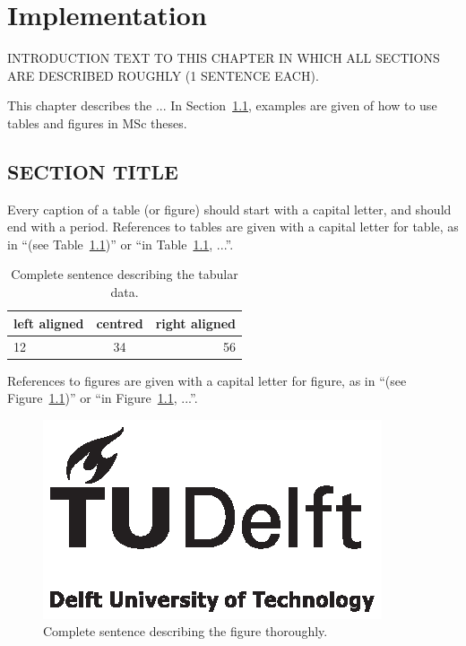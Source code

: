 \chapter{Implementation}
\label{chp:CHAPTERTITLE}
INTRODUCTION TEXT TO THIS CHAPTER IN WHICH ALL SECTIONS ARE DESCRIBED ROUGHLY (1 SENTENCE EACH).

This chapter describes the ... In Section~\ref{sec:SECTIONTITLE}, examples are given of how to use tables and figures in MSc theses.

\section{SECTION TITLE}
\label{sec:SECTIONTITLE}

Every caption of a table (or figure) should start with a capital letter, and should end with a period. References to tables are given with a capital letter for table, as in ``(see Table~\ref{tab:EXAMPLETABLE})'' or ``in Table~\ref{tab:EXAMPLETABLE}, ...''.

\begin{table}[htb]
\centering
\begin{tabular}{|l|c|r|}
\hline %
left aligned & centred & right aligned \\
\hline \hline
12           & 34      & 56            \\
\hline
\end{tabular}
\caption{Complete sentence describing the tabular data.}
\label{tab:EXAMPLETABLE}
\end{table}

References to figures are given with a capital letter for figure, as in ``(see Figure~\ref{fig:EXAMPLEFIGURE})'' or ``in Figure~\ref{fig:EXAMPLEFIGURE}, ...''.

\cite{b}
\cite{a}

\begin{figure}[htb]
\includegraphics[angle=180,width=\textwidth]{pics/TUD_logo_zw}
\caption{Complete sentence describing the figure thoroughly.}
\label{fig:EXAMPLEFIGURE}
\end{figure}

